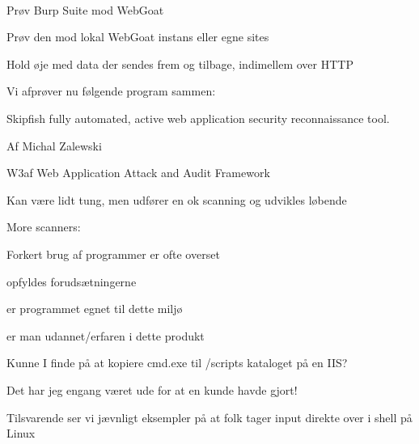 \documentclass[20pt,landscape,a4paper,footrule]{foils}
\begin{document}
\\



\begin{list1}
\item Prøv Burp Suite mod WebGoat
\item Prøv den mod lokal WebGoat instans eller egne sites
\item Hold øje med data der sendes frem og tilbage, indimellem over HTTP
\end{list1}




\begin{list1}
\item Vi afprøver nu følgende program sammen:
\item Skipfish fully automated, active web application security reconnaissance tool.
\item Af Michal Zalewski 
\end{list1}




\begin{list1}
\item W3af Web Application Attack and Audit Framework
\item Kan være lidt tung, men udfører en ok scanning og udvikles løbende
\item {}
\end{list1}

More scanners:\\
{\small {}}



\begin{list1}
\item Forkert brug af programmer er ofte overset
\begin{list2}
\item opfyldes forudsætningerne
\item er programmet egnet til dette miljø
\item er man udannet/erfaren i dette produkt
\end{list2}
\item Kunne I finde på at kopiere cmd.exe til
/scripts kataloget på en IIS?
\item Det har jeg engang været ude for at en kunde havde gjort!
\item Tilsvarende ser vi jævnligt eksempler på at folk tager input direkte over i shell på Linux
\end{list1}
\end{document}
